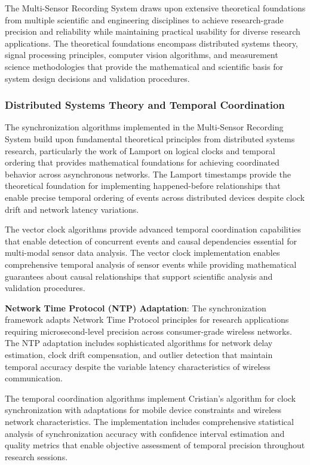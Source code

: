 \documentclass[11pt,a4paper]{report}
\begin{document}
The Multi-Sensor Recording System draws upon extensive theoretical foundations from multiple scientific and engineering
disciplines to achieve research-grade precision and reliability while maintaining practical usability for diverse
research applications. The theoretical foundations encompass distributed systems theory, signal processing principles,
computer vision algorithms, and measurement science methodologies that provide the mathematical and scientific basis for
system design decisions and validation procedures.

\subsubsection{Distributed Systems Theory and Temporal Coordination}

The synchronization algorithms implemented in the Multi-Sensor Recording System build upon fundamental theoretical
principles from distributed systems research, particularly the work of Lamport on logical clocks and temporal ordering
that provides mathematical foundations for achieving coordinated behavior across asynchronous networks. The Lamport
timestamps provide the theoretical foundation for implementing happened-before relationships that enable precise
temporal ordering of events across distributed devices despite clock drift and network latency variations.

The vector clock algorithms provide advanced temporal coordination capabilities that enable detection of concurrent
events and causal dependencies essential for multi-modal sensor data analysis. The vector clock implementation enables
comprehensive temporal analysis of sensor events while providing mathematical guarantees about causal relationships that
support scientific analysis and validation procedures.

\textbf{Network Time Protocol (NTP) Adaptation}: The synchronization framework adapts Network Time Protocol principles for
research applications requiring microsecond-level precision across consumer-grade wireless networks. The NTP adaptation
includes sophisticated algorithms for network delay estimation, clock drift compensation, and outlier detection that
maintain temporal accuracy despite the variable latency characteristics of wireless communication.

The temporal coordination algorithms implement Cristian's algorithm for clock synchronization with adaptations for
mobile device constraints and wireless network characteristics. The implementation includes comprehensive statistical
analysis of synchronization accuracy with confidence interval estimation and quality metrics that enable objective
assessment of temporal precision throughout research sessions.
\end{document}
